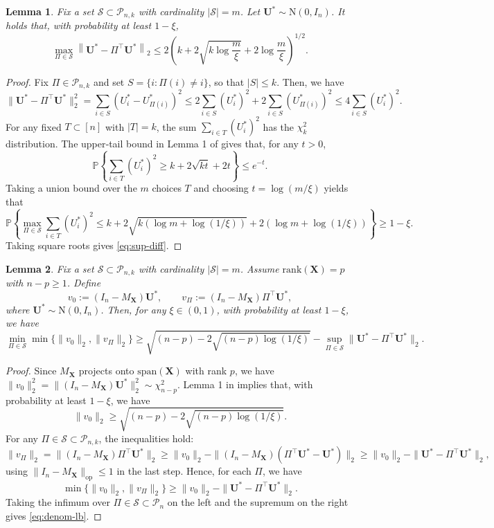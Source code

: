 \documentclass[11pt, reqno]{amsart}
\newcommand{\bP}{\mathbb{P}}
\renewcommand{\le}{\leqslant}
\renewcommand{\ge}{\geqslant}
\newcommand{\mP}{\mathcal{P}}
\newcommand{\mS}{\mathcal{S}}
\newcommand{\1}{\mbox{1}\hspace{-0.25em}\mbox{l}}
\newcommand{\rank}{\mathrm{rank}}
\newcommand{\Normal}{\mathrm{N}}
\newcommand{\Normalp}[2]{\Normal\left(#1,#2\right)}
\theoremstyle{definition}\newtheorem{problem}{Problem}[section]
\theoremstyle{definition}\newtheorem{definition}[problem]{Definition}
\theoremstyle{remark}\newtheorem{assumption}{Assumption}
\theoremstyle{remark}\newtheorem{remark}[problem]{Remark}
\theoremstyle{definition}\newtheorem{example}[problem]{Example}
\theoremstyle{plain}\newtheorem{theorem}[problem]{Theorem}
\theoremstyle{plain}\newtheorem{question}[problem]{Question}
\theoremstyle{plain}\newtheorem{lemma}[problem]{Lemma}
\theoremstyle{plain}\newtheorem{proposition}[problem]{Proposition}
\theoremstyle{plain}\newtheorem{corollary}[problem]{Corollary}
\theoremstyle{plain}\newtheorem{conjecture}[problem]{Conjecture}
\begin{document}
\begin{lemma}\label{lem:perm-diff-finite}
Fix a set $\mS \subset \mP_{n,k}$ with cardinality $|\mS|=m$. Let $\bm U^*\sim\Normalp{0}{I_n}$. It holds that, with probability at least $1-\xi$,
\begin{equation}\label{eq:sup-diff}
\max_{\Pi\in\mS} \left\|\bm U^*-\Pi^\top\bm U^*\right\|_2
\le
2\left(k+2\sqrt{k\log\frac{m}{\xi}}+2\log\frac{m}{\xi}\right)^{1/2}.
\end{equation}
\end{lemma}


\begin{proof}
Fix $\Pi\in\mP_{n,k}$ and set $S=\{i:\Pi(i)\neq i\}$, so that $|S|\le k$. Then, we have
\[
\|\bm{U}^*-\Pi^\top \bm{U}^*\|_2^2
=\sum_{i\in S}({U}^*_i-{U}^*_{\Pi(i)})^2
\le 2\sum_{i\in S}({U}^*_i)^2+2\sum_{i\in S}({U}^*_{\Pi(i)})^2
\le 4\sum_{i\in S}({U}^*_i)^2.
\]
For any fixed $T\subset[n]$ with $|T|=k$, the sum $\sum_{i\in T}({U}^*_i)^2$ has the $\chi^2_k$ distribution. The upper‑tail bound in Lemma 1 of \cite{laurent2000adaptive} gives that, for any $t>0$,
\[
\bP \left\{\sum_{i\in T}({U}^*_i)^2  \ge k + 2\sqrt{k t} + 2t\right\}  \le e^{-t}.
\]
Taking a union bound over the $m$ choices $T$ and choosing $t=\log \left(m/\xi\right)$ yields that
\[
\bP \left\{
\max_{\Pi \in \mS}\sum_{i\in T}({U}^*_i)^2
 \le
k + 2\sqrt{k \left( \log m+\log(1/\xi) \right)} + 2\left( \log m +\log(1/\xi) \right)
\right\}
 \ge 1-\xi.
\] Taking square roots gives \eqref{eq:sup-diff}.
\end{proof}

\begin{lemma}\label{lem:denom-lb}
Fix a set $\mS \subset \mP_{n,k}$ with cardinality $|\mS|=m$. Assume $\rank(\bm X)=p$ with $n-p\ge 1$. Define
\[
v_0:=(I_n-M_{\bm X}) \bm U^*,
\qquad
v_\Pi:=(I_n-M_{\bm X}) \Pi^\top \bm U^*,
\]
where $\bm U^*\sim\Normalp{0}{I_n}$. Then, for any $\xi\in(0,1)$, with probability at least $1-\xi$, we have
\begin{equation}
\min_{\Pi\in\mS} \min\{\|v_0\|_2,\|v_\Pi\|_2\}
\ge
\sqrt{(n-p)-2\sqrt{(n-p)\log(1/\xi)}}
-\sup_{\Pi\in\mS } \|\bm U^*-\Pi^\top \bm U^*\|_2 .
\label{eq:denom-lb}
\end{equation}
\end{lemma}

\begin{proof}
Since $M_{\bm X}$ projects onto $\mathrm{span}(\bm X)$ with rank $p$, we have
$\|v_0\|_2^2=\|(I_n-M_{\bm X})\bm U^*\|_2^2\sim\chi^2_{n-p}$. Lemma 1 in \cite{laurent2000adaptive} implies that, with probability at least $1-\xi$, we have
\[
\|v_0\|_2  \ge  \sqrt{ (n-p)-2\sqrt{(n-p)\log(1/\xi)}}.
\]
For any $\Pi\in\mS \subset \mP_{n,k}$, the inequalities hold:
\[
\|v_\Pi\|_2
=\|(I_n-M_{\bm X})\Pi^\top \bm U^*\|_2
 \ge \|v_0\|_2 - \|(I_n-M_{\bm X})(\Pi^\top \bm U^*-\bm U^*)\|_2
 \ge \|v_0\|_2 - \|\bm U^*-\Pi^\top \bm U^*\|_2,
\]
using $\|I_n-M_{\bm X}\|_{\mathrm{op}}\le 1$ in the last step. Hence, for each $\Pi$, we have
\[
\min\{\|v_0\|_2,\|v_\Pi\|_2\} \ge \|v_0\|_2 - \|\bm U^*-\Pi^\top \bm U^*\|_2.
\]
Taking the infimum over $\Pi\in\mS \subset \mP_n$ on the left and the supremum on the right gives \eqref{eq:denom-lb}.
\end{proof}
\end{document}
